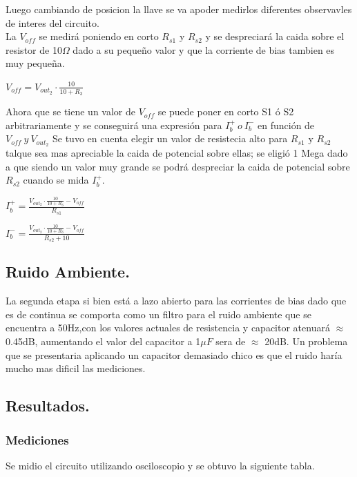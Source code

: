 \documentclass[a4paper]{article}
\begin{document}
Luego cambiando de posicion la llave se va apoder medirlos diferentes observavles de interes del circuito.\\
La $V_{off}$ se medirá poniendo en corto $R_{s1}$ y $R_{s2}$ y se despreciará la caida sobre el resistor de 10$\Omega$ dado a su pequeño valor y que la corriente de bias tambien es muy pequeña.\\
\begin{center}$V_{off}=V_{out_2} \cdot \frac{10}{10+R_3} $\end{center}
Ahora que se tiene un valor de $V_{off}$ se  puede poner en corto S1 ó S2 arbitrariamente y se conseguirá una expresión para $ I_b^+ \ o \  I_b^-$ en función de $V_{off} \ y \ V_{out_2}$
Se tuvo en cuenta elegir un valor de resistecia alto para $R_{s1}$ y $R_{s2}$ talque sea mas apreciable la caida de potencial sobre ellas; se eligió 1 Mega dado a que siendo un valor muy grande se podrá despreciar la caida de potencial sobre $R_{s2}$  cuando se mida $I_b^+$.\\
\begin{center}$I_b^+=\frac{V_{out_2} \cdot \frac{10}{10+R_3}-V_{off}}{R_{s1}}$\end{center}
\begin{center}$I_b^-=\frac{V_{out_2} \cdot \frac{10}{10+R_3}-V_{off}}{R_{s2}+10}$\end{center}

\subsection{Ruido Ambiente.}
La segunda etapa si bien está a lazo abierto para las corrientes de bias dado que es de continua se comporta como un filtro para el ruido ambiente que se encuentra a 50Hz,con los valores actuales de resistencia y capacitor atenuará $\approx$ 0.45dB, aumentando el valor del capacitor a 1$\mu F$ sera de  $\approx$ 20dB.
Un problema que se presentaria aplicando un capacitor demasiado chico es que el ruido haría mucho mas dificil las mediciones.
\subsection{Resultados.}
\subsubsection{Mediciones}
Se midio el circuito utilizando osciloscopio y se  obtuvo la siguiente tabla.
\end{document}
